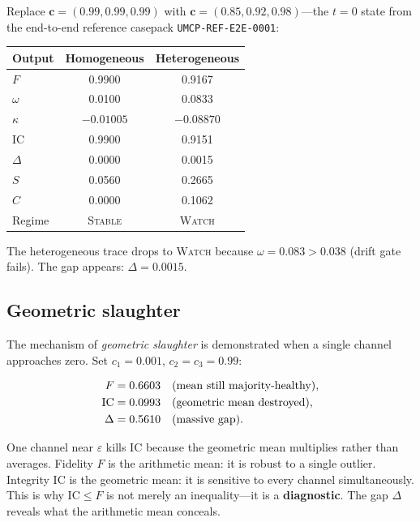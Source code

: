 \documentclass[
  aps,
  prd,
  twocolumn,
  superscriptaddress,
  nofootinbib,
  floatfix
]{revtex4-2}
\newcommand{\eps}{\varepsilon}
\newcommand{\regime}[1]{\textrm{\upshape\scshape#1}}
\newcommand{\tvec}{\mathbf{c}}
\newcommand{\IC}{\mathrm{IC}}
\begin{document}
Replace $\tvec = (0.99, 0.99, 0.99)$ with
$\tvec = (0.85, 0.92, 0.98)$---the $t = 0$ state from the
end-to-end reference casepack \texttt{UMCP-REF-E2E-0001}:

\begin{center}
\begin{tabular}{lcc}
\toprule
Output & Homogeneous & Heterogeneous \\
\midrule
$F$ & 0.9900 & 0.9167 \\
$\omega$ & 0.0100 & 0.0833 \\
$\kappa$ & $-0.01005$ & $-0.08870$ \\
$\IC$ & 0.9900 & 0.9151 \\
$\Delta$ & 0.0000 & 0.0015 \\
$S$ & 0.0560 & 0.2665 \\
$C$ & 0.0000 & 0.1062 \\
Regime & \regime{Stable} & \regime{Watch} \\
\bottomrule
\end{tabular}
\end{center}

The heterogeneous trace drops to \regime{Watch} because
$\omega = 0.083 > 0.038$ (drift gate fails).  The gap appears:
$\Delta = 0.0015$.

\subsection{Geometric slaughter}\label{app:slaughter}

The mechanism of \emph{geometric slaughter} is demonstrated when
a single channel approaches zero.  Set $c_1 = 0.001$,
$c_2 = c_3 = 0.99$:

\begin{align}
  F &= 0.6603 \quad \text{(mean still majority-healthy)}, \notag \\
  \IC &= 0.0993 \quad \text{(geometric mean destroyed)}, \notag \\
  \Delta &= 0.5610 \quad \text{(massive gap)}. \notag
\end{align}

One channel near $\eps$ kills $\IC$ because the geometric mean
multiplies rather than averages.  Fidelity $F$ is the arithmetic
mean: it is robust to a single outlier.  Integrity $\IC$ is the
geometric mean: it is sensitive to every channel simultaneously.
This is why $\IC \leq F$ is not merely an inequality---it is a
\textbf{diagnostic}.  The gap $\Delta$ reveals what the arithmetic
mean conceals.
\end{document}
